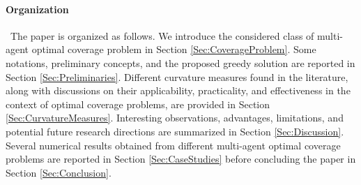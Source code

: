 \documentclass[letterpaper, 10 pt, conference]{ieeeconf}
\begin{document}

\paragraph*{Organization}\ 
The paper is organized as follows. We introduce the considered class of multi-agent optimal coverage problem in Section \ref{Sec:CoverageProblem}. Some notations, preliminary concepts, and the proposed greedy solution are reported in Section \ref{Sec:Preliminaries}. Different curvature measures found in the literature, along with discussions on their applicability, practicality, and effectiveness in the context of optimal coverage problems, are provided in Section \ref{Sec:CurvatureMeasures}. 
Interesting observations, advantages, limitations, and potential future research directions are summarized in Section \ref{Sec:Discussion}. 
Several numerical results obtained from different multi-agent optimal coverage problems \cite{Welikala2019J1} are reported in Section \ref{Sec:CaseStudies} before concluding the paper in Section \ref{Sec:Conclusion}. 
\end{document}
